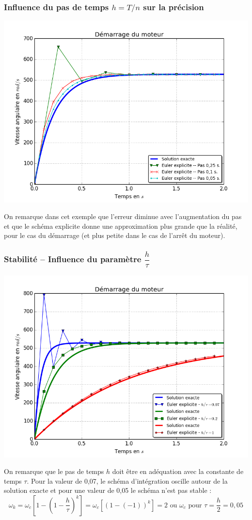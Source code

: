 \documentclass[10pt]{article}
\begin{document}
\subsubsection{Influence du pas de temps $h=T/n$ sur la précision}

\begin{center}
\includegraphics[width=.7\textwidth]{images/fig_07_bis}
\end{center}

On remarque dans cet exemple que l’erreur diminue avec l’augmentation du pas et que le schéma explicite donne une approximation plus grande que la réalité, pour le cas du démarrage (et plus petite dans le cas de l’arrêt du moteur).


\subsubsection{Stabilité -- Influence du paramètre $\dfrac{h}{\tau}$}

\begin{center}
\includegraphics[width=.7\textwidth]{images/fig_08_bis}
\end{center}

On remarque que le pas de temps $h$ doit être en adéquation avec la constante de temps $\tau$. Pour la valeur de 0,07, le schéma d’intégration oscille autour de la solution exacte et pour une valeur de 0,05 le schéma n’est pas stable :
$$\omega_k=\omega_c\left[1-\left(1-\dfrac{h}{\tau}\right)^k \right]=\omega_c[(1-(-1))^k ]=2\text{ ou }\omega_c \text{ pour } \tau=\dfrac{h}{2}=0,05 $$
\end{document}
